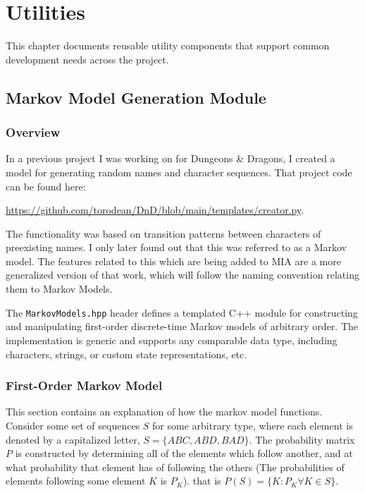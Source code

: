 \chapter{Utilities}
\label{chap:utilities}

This chapter documents reusable utility components that support common development needs across the project.












\section{Markov Model Generation Module}

\subsection{Overview}

In a previous project I was working on for Dungeons \& Dragons, I created a model for generating random names and character sequences. That project code can be found here: 
\begin{center}
\url{https://github.com/torodean/DnD/blob/main/templates/creator.py}. 
\end{center}
The functionality was based on transition patterns between characters of preexisting names. I only later found out that this was referred to as a Markov model. The features related to this which are being added to MIA are a more generalized version of that work, which will follow the naming convention relating them to Markov Models.

The \texttt{MarkovModels.hpp} header defines a templated C++ module for constructing and manipulating first-order discrete-time Markov models of arbitrary order. The implementation is generic and supports any comparable data type, including characters, strings, or custom state representations, etc.

\subsection{First-Order Markov Model}

This section contains an explanation of how the markov model functions. Consider some set of sequences $S$ for some arbitrary type, where each element is denoted by a capitalized letter, $S=\{ABC, ABD, BAD\}$. The probability matrix $P$ is constructed by determining all of the elements which follow another, and at what probability that element has of following the others (The probabilities of elements following some element $K$ is $P_K$). that is $P(S) = \{K:P_K \forall K \in S\}$.

